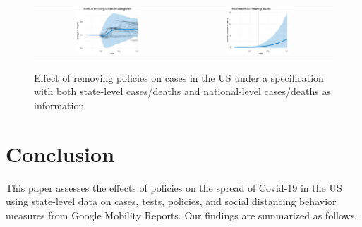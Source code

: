 \documentclass[11pt,reqno,letter]{amsart}
\theoremstyle{definition}
\begin{document}
\begin{figure}[ht]
  \caption{Effect of removing policies on cases in the US under a specification with both
  state-level cases/deaths and national-level cases/deaths as information \label{fig:US-nop}}
  \begin{minipage}{\linewidth}
    \centering
    \begin{tabular}{cc}
      \includegraphics[width=0.45\textwidth]{tables_and_figures/us-nop-dgrowth}
      &
        \includegraphics[width=0.45\textwidth]{tables_and_figures/us-nop-rel}
    \end{tabular}
  \end{minipage}
\end{figure}






\afterpage{\clearpage}

\section{Conclusion}


This paper assesses the effects of policies on the spread of Covid-19 in the US using state-level data on cases, tests, policies, and social distancing behavior measures from Google Mobility Reports. Our findings are summarized as follows.
\end{document}
